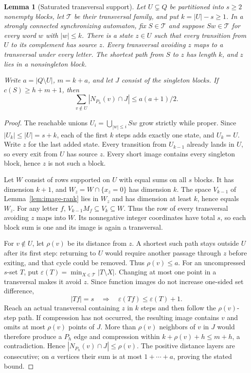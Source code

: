 \documentclass[11pt]{article}
\newtheorem{lemma}[theorem]{Lemma}
\theoremstyle{definition}
\theoremstyle{plain}
\begin{document}
\begin{lemma}[Saturated transversal support]\label{lem:transversal-exit}
Let $U\subsetneq Q$ be partitioned into $s\ge2$ nonempty blocks,
let $\mathcal T$ be their transversal family, and put $k=|U|-s\ge1$.
In a strongly connected synchronizing automaton, fix $S\in\mathcal T$
and suppose $Sw\in\mathcal T$ for every word $w$ with $|w|\le k$.
There is a state $z\in U$ such that every transition from $U$ to its
complement has source $z$. Every transversal avoiding $z$ maps to a
transversal under every letter. The shortest path from $S$ to $z$ has
length $k$, and $z$ lies in a nonsingleton block.

Write $a=|Q\setminus U|$, $m=k+a$, and let $J$ consist of the singleton
blocks. If $c(S)\ge h+m+1$, then
\[
 \sum_{v\notin U}|N_{P_h}(v)\cap J|\le a(a+1)/2.
\]
\end{lemma}
\begin{proof}
The reachable unions $U_i=\bigcup_{|w|\le i}Sw$ grow strictly while
proper. Since $|U_k|\le|U|=s+k$, each of the first $k$ steps adds
exactly one state, and $U_k=U$. Write $z$ for the last added state.
Every transition from $U_{k-1}$ already lands in $U$, so every exit
from $U$ has source $z$. Every short image contains every singleton
block, hence $z$ is not such a block.

Let $W$ consist of rows supported on $U$ with equal sums on all $s$
blocks. It has dimension $k+1$, and $W_z=W\cap\{x_z=0\}$ has dimension
$k$. The space $V_{k-1}$ of Lemma~\ref{lem:image-rank} lies in $W_z$
and has dimension at least $k$, hence equals $W_z$.
For any letter $f$, $V_{k-1}M_f\subseteq V_k\subseteq W$.
Thus the row of every transversal avoiding $z$ maps into $W$.
Its nonnegative integer coordinates have total $s$, so each block sum
is one and its image is again a transversal.

For $v\notin U$, let $\rho(v)$ be its distance from $z$.
A shortest such path stays outside $U$ after its first step:
returning to $U$ would require another passage through $z$ before
exiting, and that cycle could be removed. Thus $\rho(v)\le a$.
For an uncompressed $s$-set $T$, put
$\varepsilon(T)=\min_{X\in\mathcal T}|T\setminus X|$.
Changing at most one point in a transversal makes it avoid $z$.
Since function images do not increase one-sided set difference,
\[
 |Tf|=s\quad\Longrightarrow\quad
 \varepsilon(Tf)\le\varepsilon(T)+1.
\]
Reach an actual transversal containing $z$ in $k$ steps and then
follow the $\rho(v)$-step path. If compression has not occurred,
the resulting image contains $v$ and omits at most $\rho(v)$ points
of $J$. More than $\rho(v)$ neighbors of $v$ in $J$ would therefore
produce a $P_h$ edge and compression within $k+\rho(v)+h\le m+h$,
a contradiction. Hence $|N_{P_h}(v)\cap J|\le\rho(v)$.
The positive distance layers are consecutive; on $a$ vertices their
sum is at most $1+\cdots+a$, proving the stated bound.
\end{proof}
\end{document}
